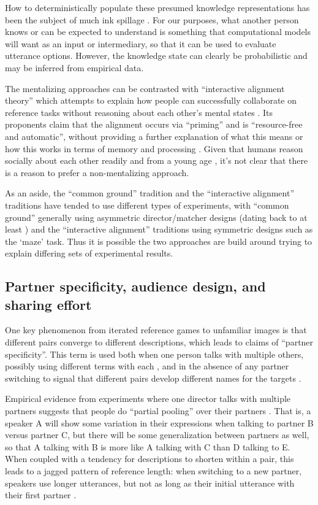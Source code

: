 \documentclass[]{article}
\begin{document}
How to deterministically populate these presumed knowledge representations has been the subject of much ink spillage \citep{horton1996,clark1996, TODO}. For our purposes, what another person knows or can be expected to understand is something that computational models will want as an input or intermediary, so that it can be used to evaluate utterance options. However, the knowledge state can clearly be probabilistic and may be inferred from empirical data. 

The mentalizing approaches can be contrasted with ``interactive alignment theory'' which attempts to explain how people can successfully collaborate on reference tasks without reasoning about each other's mental states \citep{pickering2004, gandolfi2022}. Its proponents claim that the alignment occurs via ``priming'' and is ``resource-free and automatic'', without providing a further explanation of what this means or how this works in terms of memory and processing \citep{pickering2004}.  Given that humans reason socially about each other readily and from a young age \citep{TODO}, it's not clear that there is a reason to prefer a non-mentalizing approach. 

As an aside, the ``common ground'' tradition and the ``interactive alignment'' traditions have tended to use different types of experiments, with ``common ground'' generally using asymmetric director/matcher designs (dating back to at least \citet{krauss1966}) and the ``interactive alignment'' traditions using symmetric designs such as the `maze' task. Thus it is possible the two approaches are build around trying to explain differing sets of experimental results. 

\subsection{Partner specificity, audience design, and sharing effort}

One key phenomenon from iterated reference games to unfamiliar images is that different pairs converge to different descriptions, which leads to claims of ``partner specificity''. This term is used both when one person talks with multiple others, possibly using different terms with each \citep{TODO}, and in the absence of any partner switching to signal that different pairs develop different names for the targets \citep{TODO}. 

Empirical evidence from experiments where one director talks with multiple partners suggests that people do ``partial pooling'' over their partners \citep{hawkins2021, yoon2014}. That is, a speaker A will show some variation in their expressions when talking to partner B versus partner C, but there will be some generalization between partners as well, so that A talking with B is more like A talking with C than D talking to E. When coupled with a tendency for descriptions to shorten within a pair, this leads to a jagged pattern of reference length: when switching to a new partner, speakers use longer utterances, but not as long as their initial utterance with their first partner \citep{yoon2019a}.  
\end{document}
